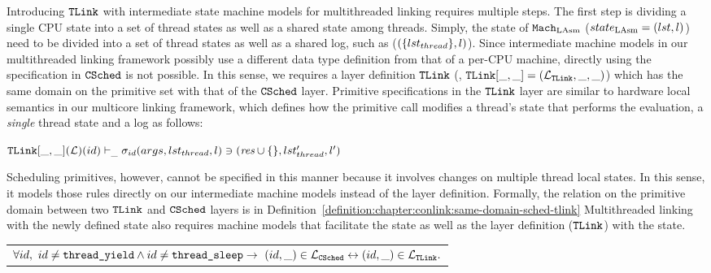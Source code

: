 Introducing ${{\mathrm{\texttt{TLink}}}}$ with intermediate state machine models for multithreaded linking requires multiple steps. 
The first step is
dividing a single CPU state into a set of thread states as well as a shared state among threads.
Simply, the state of ${\mathrm{\texttt{Mach}}}_{\mathrm{LAsm}}$ ($state_{\mathrm{LAsm}} = (lst, l)$) need to be divided into 
a set of thread states as well as a shared log, such as ($(\{lst_{thread}\}, l)$).
Since intermediate machine models in our multithreaded linking framework possibly use a different data type definition from that of a per-CPU machine, 
directly using the specification in  ${{\mathrm{\texttt{CSched}}}}$ is not possible. 
In this sense, 
we requires a layer definition ${{\mathrm{\texttt{TLink}}}}$ (\ie, ${{\mathrm{\texttt{TLink}}}}[\_, \_] = (\mathcal{L}_{{{\mathrm{\texttt{TLink}}}}}, \_, \_)$) which has the same domain on the primitive set with that of the ${{\mathrm{\texttt{CSched}}}}$ layer.
Primitive specifications in the ${{\mathrm{\texttt{TLink}}}}$ layer are similar to hardware local semantics in our multicore linking framework,
which defines how the primitive call modifies a thread's state that performs the evaluation,
a \textit{single} thread state and a log as follows:
\begin{center}
${{\mathrm{\texttt{TLink}}}}[\_, \_](\mathcal{L})(id)
 \vdash_{\_}  \sigma_{id}(args, lst_{thread}, l) \ni (\textit{res}\cup \{\}, lst_{thread}', l')$
\end{center}
Scheduling primitives, however, cannot be specified in this manner because it involves changes on multiple thread local states. 
 In this sense, it models those rules directly on our intermediate machine models 
 instead of the layer definition.
 Formally, the relation on the primitive domain between two ${{\mathrm{\texttt{TLink}}}}$ and ${{\mathrm{\texttt{CSched}}}}$ layers 
 is in Definition~\ref{definition:chapter:conlink:same-domain-sched-tlink}
 Multithreaded linking with the newly defined state also 
requires machine models that facilitate the state as well as the layer definition (${{\mathrm{\texttt{TLink}}}}$) with the state.

\begin{definition}
\label{definition:chapter:conlink:same-domain-sched-tlink}
\begin{tabular}{P{0.95\textwidth}}
$\forall id,\ id \neq {\mathrm{\texttt{thread\_yield}}} \wedge id \neq {\mathrm{\texttt{thread\_sleep}}} \rightarrow 
 \ (id, \_) \in \mathcal{L}_{{{\mathrm{\texttt{CSched}}}}} \leftrightarrow (id, \_) \in  \mathcal{L}_{{{\mathrm{\texttt{TLink}}}}}.$\\
\end{tabular}
\end{definition}



